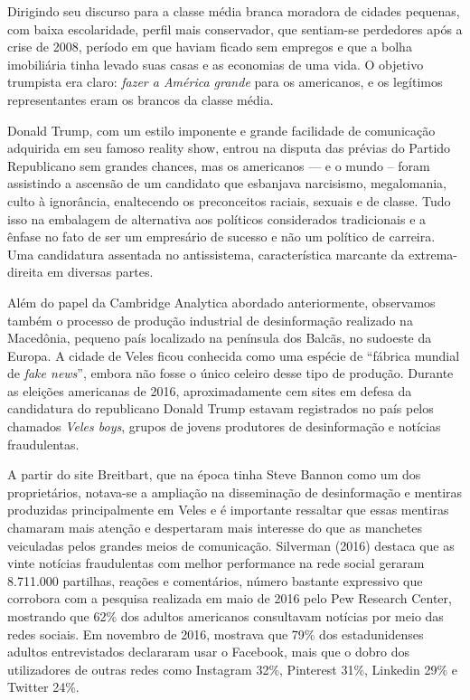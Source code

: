 Dirigindo seu discurso para a classe média branca moradora de cidades
pequenas, com baixa escolaridade, perfil mais conservador, que sentiam-se
perdedores após a crise de 2008, período em que haviam ficado sem
empregos e que a bolha imobiliária tinha levado suas casas e as
economias de uma vida. O objetivo trumpista era claro: \textit{fazer a América
grande} para os americanos, e os legítimos representantes eram os brancos
da classe média.

Donald Trump, com um estilo imponente e grande facilidade de comunicação
adquirida em seu famoso reality show, entrou na disputa das prévias do
Partido Republicano sem grandes chances, mas os americanos --- e o mundo
-- foram assistindo a ascensão de um candidato que esbanjava narcisismo,
megalomania, culto à ignorância, enaltecendo os preconceitos raciais,
sexuais e de classe. Tudo isso na embalagem de alternativa aos políticos
considerados tradicionais e a ênfase no fato de ser um empresário de
sucesso e não um político de carreira. Uma candidatura assentada no
antissistema, característica marcante da extrema-direita em diversas
partes.

Além do papel da Cambridge Analytica abordado anteriormente, observamos
também o processo de produção industrial de desinformação realizado na
Macedônia, pequeno país localizado na península dos Balcãs, no sudoeste
da Europa. A cidade de Veles ficou conhecida como uma espécie de
``fábrica mundial de \textit{fake news}'', embora não fosse o único
celeiro desse tipo de produção. Durante as eleições americanas de 2016,
aproximadamente cem sites em defesa da candidatura do republicano Donald
Trump estavam registrados no país pelos chamados \textit{Veles boys}, grupos de
jovens produtores de desinformação e notícias fraudulentas.

A partir do site Breitbart, que na época tinha Steve Bannon como um dos
proprietários, notava-se a ampliação na disseminação de desinformação e
mentiras produzidas principalmente em Veles e é importante ressaltar que
essas mentiras chamaram mais atenção e despertaram mais interesse do que
as manchetes veiculadas pelos grandes meios de comunicação. Silverman
(2016) destaca que as vinte notícias fraudulentas com melhor performance
na rede social geraram 8.711.000 partilhas, reações e comentários,
número bastante expressivo que corrobora com a pesquisa realizada em
maio de 2016 pelo Pew Research Center, mostrando que 62\% dos adultos
americanos consultavam notícias por meio das redes sociais. Em novembro
de 2016, mostrava que 79\% dos estadunidenses adultos entrevistados
declararam usar o Facebook, mais que o dobro dos utilizadores de outras
redes como Instagram 32\%, Pinterest 31\%, Linkedin 29\% e Twitter 24\%.

